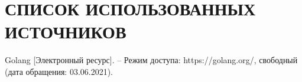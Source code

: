 \section*{СПИСОК ИСПОЛЬЗОВАННЫХ ИСТОЧНИКОВ}

\begingroup
\renewcommand{\section}[2]{}
\begin{thebibliography}{}
	Golang [Электронный ресурс]. – Режим доступа:
	https://golang.org/,
	свободный (дата обращения: 03.06.2021).
\end{thebibliography}
\endgroup

\pagebreak